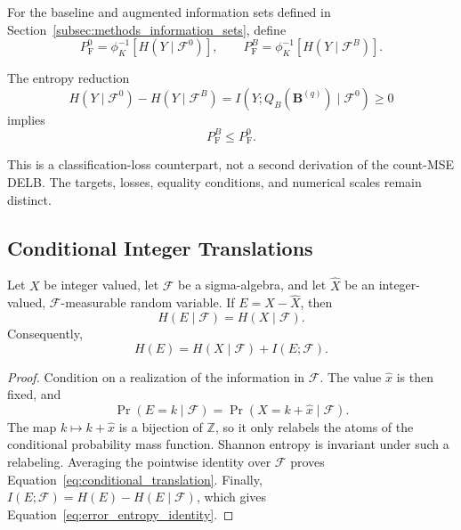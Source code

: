 For the baseline and augmented information sets defined in
Section~\ref{subsec:methods_information_sets}, define
\begin{equation}
P_{\mathrm F}^{0}
=\phi_K^{-1}[H(Y\mid\mathcal F^0)],
\qquad
P_{\mathrm F}^{B}
=\phi_K^{-1}[H(Y\mid\mathcal F^B)].
\label{eq:fano_mobility_floors}
\end{equation}

\begin{Corollary}
\label{cor:mobility_fano_ordering}
The entropy reduction
\begin{equation}
H(Y\mid\mathcal F^0)-H(Y\mid\mathcal F^B)
=I(Y;Q_B(\mathbf B^{(q)})\mid\mathcal F^0)\geq0
\label{eq:fano_mobility_cmi}
\end{equation}
implies
\begin{equation}
P_{\mathrm F}^{B}\leq P_{\mathrm F}^{0}.
\label{eq:fano_mobility_floor_order}
\end{equation}
\end{Corollary}

This is a classification-loss counterpart, not a second derivation of the
count-MSE DELB. The targets, losses, equality conditions, and numerical
scales remain distinct.

\subsection{Conditional Integer Translations}

\begin{Lemma}
\label{lem:conditional_translation}
Let \(X\) be integer valued, let \(\mathcal{F}\) be a sigma-algebra, and let
\(\widehat{X}\) be an integer-valued, \(\mathcal{F}\)-measurable random
variable. If \(E=X-\widehat{X}\), then
\begin{equation}
H(E\mid\mathcal{F})=H(X\mid\mathcal{F}).
\label{eq:conditional_translation}
\end{equation}
Consequently,
\begin{equation}
H(E)
=
H(X\mid\mathcal{F})+I(E;\mathcal{F}).
\label{eq:error_entropy_identity}
\end{equation}
\end{Lemma}

\begin{proof}
Condition on a realization of the information in \(\mathcal{F}\). The value
\(\widehat{x}\) is then fixed, and
\[
\Pr(E=k\mid\mathcal{F})
=
\Pr(X=k+\widehat{x}\mid\mathcal{F}).
\]
The map \(k\mapsto k+\widehat{x}\) is a bijection of \(\mathbb{Z}\), so it
only relabels the atoms of the conditional probability mass function.
Shannon entropy is invariant under such a relabeling. Averaging the
pointwise identity over \(\mathcal{F}\) proves
Equation~\eqref{eq:conditional_translation}. Finally,
\(I(E;\mathcal{F})=H(E)-H(E\mid\mathcal{F})\), which gives
Equation~\eqref{eq:error_entropy_identity}.
\end{proof}

